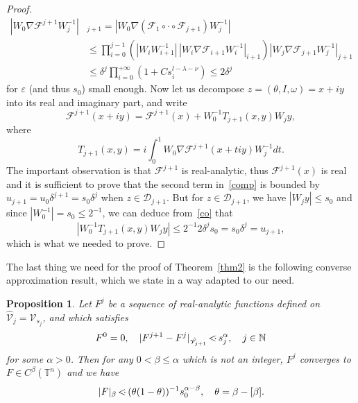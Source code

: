 \documentclass[JEP,XML,SOM,Unicode]{cedram}
\let\mathcal\mathscr
\numberwithin{equation}{section}
\theoremstyle{plain}
\newtheorem{proposition}[theorem]{Proposition}
\theoremstyle{definition}
\newcommand{\N}{\mathbb{N}}
\newcommand\T{\mathbb T}
\newcommand\MP{\,{<\hspace{-.5em}\cdot}\,}
\begin{document}
\begin{proof}
\begin{equation}\label{co}
\begin{split}
|W_0\nabla \mathcal{F}^{j+1}W_{j}^{-1}|&_{j+1} = |W_0\nabla (\mathcal{F}_1 \circ \cdot \circ \mathcal{F}_{j+1})W_{j}^{-1}|
\\
& \leq \prod_{i=0}^{j-1}\left( |W_i W_{i+1}^{-1}|\, |W_i\nabla \mathcal{F}_{i+1} W_i^{-1}|_{i+1} \right) |W_j\nabla \mathcal{F}_{j+1} W_j^{-1}|_{j+1} \\
& \leq \delta^j \prod_{i=0}^{+\infty}(1+Cs_{i}^{l-\lambda-\nu}) \leq 2\delta^j
\end{split}
\end{equation}
for $\varepsilon$ (and thus $s_0$) small enough. Now let us decompose $z=(\theta,I,\omega)=x+iy$ into its real and imaginary part, and write
\begin{equation}\label{comp}
\mathcal{F}^{j+1}(x+iy)=\mathcal{F}^{j+1}(x)+W_0^{-1}T_{j+1}(x,y)W_j y,
\end{equation}
where
\[ T_{j+1}(x,y)=i\int_0^1W_0\nabla \mathcal{F}^{j+1}(x+tiy)W_j^{-1}dt. \]
The important observation is that $\mathcal{F}^{j+1}$ is real-analytic, thus $\mathcal{F}^{j+1}(x)$ is real and it is sufficient to prove that the second term in~\eqref{comp} is bounded by $u_{j+1}=u_0\delta^{j+1}=s_0\delta^j$ when $z \in \mathcal{D}_{j+1}$. But for $z\in \mathcal{D}_{j+1}$, we have $|W_jy| \leq s_0$ and since $|W_0^{-1}|=s_0 \leq 2^{-1}$, we can deduce from~\eqref{co} that
\[ |W_0^{-1}T_{j+1}(x,y)W_j y| \leq 2^{-1}2\delta^js_0=s_0\delta^j=u_{j+1}, \]
which is what we needed to prove.
\end{proof}

The last thing we need for the proof of Theorem~\ref{thm2} is the following converse approximation result, which we state in a way adapted to our need.

\begin{proposition}\label{convsmoothing}
Let $F^j$ be a sequence of real-analytic functions defined on $\hat{\mathcal{V}}_j=\mathcal{V}_{s_j}$, and which satisfies
\[ F^0=0, \quad |F^{j+1}-F^{j}|_{\hat{\mathcal{V}}_{j+1}} \MP s_j^\alpha, \quad j \in \N \]
for some $\alpha>0$. Then for any $0<\beta \leq \alpha$ which is not an integer, $F^j$ converges to $F \in C^\beta(\T^n)$ and we have
\[ |F|_\beta \MP (\theta(1-\theta))^{-1} s_0^{\alpha-\beta}, \quad \theta=\beta-[\beta]. \]
\end{proposition}
\end{document}
